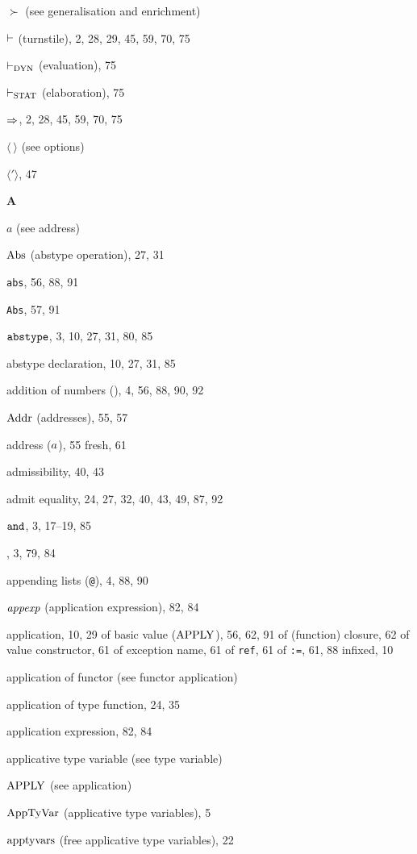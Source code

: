 \begin{theindex}
\item $\succ$ (see generalisation and enrichment) 
\item $\vdash$ (turnstile), 2, 28, 29, 45, 59, 70, 75
\item $\vdash_{\rm DYN}$ (evaluation), 75
\item $\vdash_{\rm STAT}$ (elaboration), 75
\item $\Rightarrow$, 2, 28, 45, 59, 70, 75
\item $\langle\ \rangle$ (see options) 
\item $\langle'\rangle$, 47
\indexspace
\parbox{65mm}{\hfil{\large\bf A}\hfil}
\indexspace
\item $a$ (see address) 
\item $\mathop{\rm Abs}\nolimits$ (abstype operation), 27, 31
\item {\tt abs}, 56, 88, 91
\item {\tt Abs}, 57, 91
\item ${\tt abstype}$, 3, 10, 27, 31, 80, 85
\item abstype declaration, 10, 27, 31, 85
\item addition of numbers (\ml{+}), 4, 56, 88, 90, 92
\item ${\rm Addr}$ (addresses), 55, 57
\item address ($a$), 55
\subitem fresh, 61
\item admissibility, 40, 43
\item admit equality, 24, 27, 32, 40, 43, 49, 87, 92
\item ${\tt and}$, 3, 17--19, 85
\item \ANDALSO, 3, 79, 84
\item appending lists (\verb+@+), 4, 88, 90
\item ${\it appexp}$ (application expression), 82, 84
\item application, 10, 29
\subitem of basic value (${\rm APPLY}$), 56, 62, 91
\subitem of (function) closure, 62
\subitem of value constructor, 61
\subitem of exception name, 61
\subitem of {\tt ref}, 61
\subitem of {\tt :=}, 61, 88
\subitem infixed, 10
\item application of functor (see functor application) 
\item application of type function, 24, 35
\item application expression, 82, 84
\item applicative type variable (see type variable) 
\item ${\rm APPLY}$ (see application) 
\item ${\rm AppTyVar}$ (applicative type variables), 5
\item $\mathop{\rm apptyvars}\nolimits$ (free applicative type variables), 22

\end{theindex}
